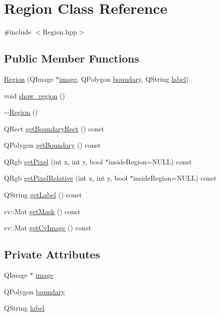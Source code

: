 \hypertarget{class_region}{\section{Region Class Reference}
\label{class_region}
}


{\ttfamily \#include $<$Region.\+hpp$>$}

\subsection*{Public Member Functions}
\begin{DoxyCompactItemize}
\item 
\hyperlink{class_region_a0e9c8974b3be20ce12a4b823f9f3f636}{Region} (Q\+Image $\ast$\hyperlink{class_region_a090b8bc9a8c73f8f874d8d439a0843be}{image}, Q\+Polygon \hyperlink{class_region_a4a59ef37013f3a6515a79317b0f0b4c0}{boundary}, Q\+String \hyperlink{_label_feature_8hpp_a331f639078ba664b292b59c4032245e1}{label})
\item 
void \hyperlink{class_region_ad2572028c1a4653a14dbfb1b622aa03e}{show\+\_\+region} ()
\item 
\hyperlink{class_region_a3c3670fff78f7511d156e3b2f0bc6266}{$\sim$\+Region} ()
\item 
Q\+Rect \hyperlink{class_region_a12c653b5aa89c899e2680c9dc1bbf46d}{get\+Boundary\+Rect} () const 
\item 
Q\+Polygon \hyperlink{class_region_a0c258b6ce768a3df3d0260c2ab19c343}{get\+Boundary} () const 
\item 
Q\+Rgb \hyperlink{class_region_acc0edaac14854ccc448f419844a722bf}{get\+Pixel} (int x, int y, bool $\ast$inside\+Region=N\+U\+L\+L) const 
\item 
Q\+Rgb \hyperlink{class_region_a421786f57555f6348ece3fa33eb86594}{get\+Pixel\+Relative} (int x, int y, bool $\ast$inside\+Region=N\+U\+L\+L) const 
\item 
Q\+String \hyperlink{class_region_a69d5acb5d1d81b50f225817217f60fdd}{get\+Label} () const 
\item 
cv\+::\+Mat \hyperlink{class_region_add72dd82adb6ee0d5822b250c3ac07e8}{get\+Mask} () const 
\item 
cv\+::\+Mat \hyperlink{class_region_ab7a8b431bfb87b6ed067915a6637cf8a}{get\+Cv\+Image} () const 
\end{DoxyCompactItemize}
\subsection*{Private Attributes}
\begin{DoxyCompactItemize}
\item 
Q\+Image $\ast$ \hyperlink{class_region_a090b8bc9a8c73f8f874d8d439a0843be}{image}
\item 
Q\+Polygon \hyperlink{class_region_a4a59ef37013f3a6515a79317b0f0b4c0}{boundary}
\item 
Q\+String \hyperlink{class_region_afcc063386e02be883d71eaf5bcef2a55}{label}
\end{DoxyCompactItemize}


